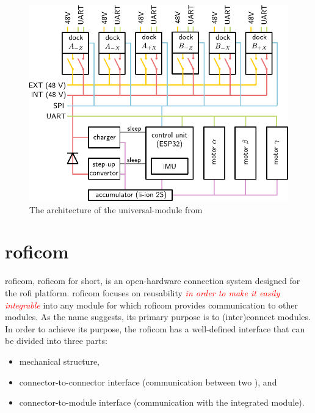 \documentclass[
  digital,     %
  oneside,     %
  nosansbold,  %
  nocolorbold, %
  nolof,         %
  nolot,         %
]{fithesis4}
\newcommand{\TODO}[1]{\textcolor{red}{\textit{#1}}}
\newcommand{\TODOLIST}[1]{}
\begin{document}
\begin{figure}[ht]
    \includegraphics{ assets/universal-module-arch.pdf }
    \caption{The architecture of the \gls{universal-module} from \TODO{\cite[p.~35]{Mrazek2019thesis}}}
    \label{fig:uni-mod-arch}
\end{figure}

\section[ RoFI Communication Mechanism ]{ \acrlong{roficom} } \label{sec:roficom}
\TODOLIST{
\begin{itemize}
    \item Explain \acrshort{roficom}
    \item Describe components --- shirt, clip and body
    \item Describe board --- RAM: 36KB, Flash: 128KB, ...
\end{itemize}
}

\acrlong{roficom}, \acrshort{roficom} for short, is an open-hardware connection system designed for the \acrshort{rofi} platform. \acrshort{roficom} focuses on reusability \TODO{in order to make it easily integrable} into any module for which \acrshort{roficom} provides
communication to other modules. As the name suggests, its primary purpose is to (inter)connect modules. In order to achieve its purpose, the \acrshort{roficom} has a well-defined interface that can be divided into three parts:
\begin{itemize}
    \item mechanical structure,
    \item connector-to-connector interface (communication between two ), and
    \item connector-to-module interface (communication with the integrated module).
\end{itemize}
\end{document}
